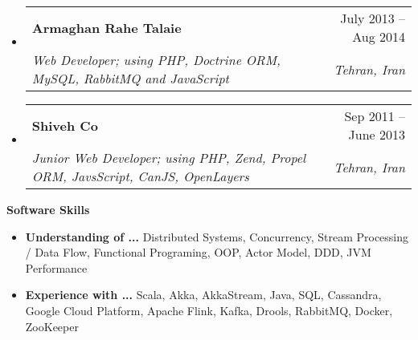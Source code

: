 \documentclass[letterpaper,12pt]{article}[leftmargin=*]
\makeatletter
\def \entryspacing {-0pt}
\renewcommand{\section}[2]{\vspace{5pt}
  \colorbox{secondary}{\color{white}\raggedbottom\normalsize\textbf{{#1}{\hspace{7pt}#2}}}
}
\newcommand{\resumeEntryStart}{\begin{itemize}[leftmargin=2.5mm]}
\newcommand{\resumeEntryEnd}{\end{itemize}\vspace{\entryspacing}}
\newcommand{\resumeEntryTSDL}[4]{
  \vspace{-1pt}\item[]
    \begin{tabular*}{0.97\textwidth}{l@{\extracolsep{\fill}}r}
      \textbf{\color{primary}#1} & {\firabook\color{accent}\small#2} \\
      \textit{\color{accent}\small#3} & \textit{\color{accent}\small#4} \\
    \end{tabular*}\vspace{-6pt}
}
\newcommand{\resumeEntryS}[2]{
  \item[]\small{
    \textbf{\color{primary}#1 }{ #2 \vspace{-6pt}}
  }
}
\makeatother
\begin{document}
\vspace{-13pt} %

  \resumeEntryStart
    \resumeEntryTSDL
      {Armaghan Rahe Talaie}{July 2013 -- Aug 2014}
      {Web Developer; using PHP, Doctrine ORM, MySQL, RabbitMQ and JavaScript}{Tehran, Iran}
  \resumeEntryEnd

\vspace{-13pt} %

  \resumeEntryStart
    \resumeEntryTSDL
      {Shiveh Co}{Sep 2011 -- June 2013}
      {Junior Web Developer; using PHP, Zend, Propel ORM, JavsScript, CanJS, OpenLayers}{Tehran, Iran}
  \resumeEntryEnd

\section{\faPuzzlePiece}{Software Skills}
	\resumeEntryStart
		\resumeEntryS{Understanding of ... } {Distributed Systems, Concurrency, Stream Processing / Data Flow, Functional Programing, OOP, Actor Model, DDD, JVM Performance}
		\resumeEntryS{Experience with ... } {Scala, Akka, AkkaStream, Java, SQL, Cassandra, Google Cloud Platform, Apache Flink, Kafka, Drools, RabbitMQ, Docker, ZooKeeper}
	\resumeEntryEnd

\end{document}
